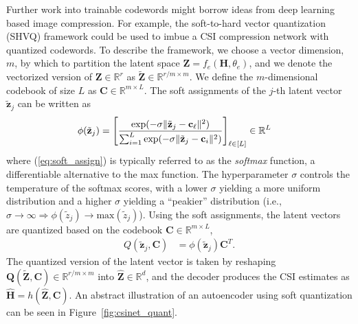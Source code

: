 Further work into trainable codewords might borrow ideas from deep learning based image compression. For example, the soft-to-hard vector quantization (SHVQ) framework \cite{ref:Agustsson2017SoftToHard} could be used to imbue a CSI compression network with quantized codewords. To describe the framework, we choose a vector dimension, $m$, by which to partition the latent space $\mathbf Z = f_e(\mathbf H, \theta_e)$, and we denote the vectorized version of $\mathbf Z \in \mathbb R^{r}$ as $\tilde{\mathbf Z} \in \mathbb R^{r/m \times m}$. We define the $m$-dimensional codebook of size $L$ as $\mathbf C \in \mathbb R^{m\times L}$. The soft assignments of the $j$-th latent vector $\tilde{\mathbf z}_j$ can be written as
\begin{align}
\phi(\tilde{\mathbf z}_j) &= \left[\frac{\text{exp}(-\sigma \Arrowvert \tilde{\mathbf z}_j - \mathbf c_\ell\Arrowvert^2)}{\sum_{i=1}^L\text{exp}(-\sigma \Arrowvert \tilde{\mathbf z}_j - \mathbf c_i\Arrowvert^2)}\right]_{\ell\in [L]} \in \mathbb R^L \label{eq:soft_assign}
\end{align}
where (\ref{eq:soft_assign}) is typically referred to as the \emph{softmax} function, a differentiable alternative to the max function. The hyperparameter $\sigma$ controls the temperature of the softmax scores, with a lower $\sigma$ yielding a more uniform distribution and a higher $\sigma$ yielding a ``peakier'' distribution (i.e., $\sigma \to \infty \Rightarrow \phi(\tilde z_j) \to \text{max}(\tilde z_j)$). Using the soft assignments, the latent vectors are quantized based on the codebook $\mathbf C \in \mathbb R^{m \times L}$,
\begin{align}
Q(\tilde{\mathbf z}_j,\mathbf C) &= \phi(\tilde{\mathbf z}_j) \mathbf C^T. \label{eq:soft_quant}
\end{align}
The quantized version of the latent vector is taken by reshaping $\mathbf Q(\tilde{\mathbf Z},\mathbf C) \in \mathbb R^{r/m \times m}$ into $\hat{\mathbf Z} \in \mathbb R^d$, and the decoder produces the CSI estimates as $\hat{\mathbf H} = h(\hat{\mathbf Z}, \mathbf C)$. An abstract illustration of an autoencoder using soft quantization can be seen in Figure~\ref{fig:csinet_quant}.

\begin{figure*}[!hbtp]
\centering
\def\svgwidth{0.8\linewidth}

\caption{Abstract architecture for a CSI compression network with the `SoftQuantize' layer ($Q(\tilde{\mathbf Z})$), a continuous, softmax-based relaxation of a $d$-dimensional quantization of the latent layer $\mathbf Z$.}
\label{fig:csinet_quant}
\end{figure*}